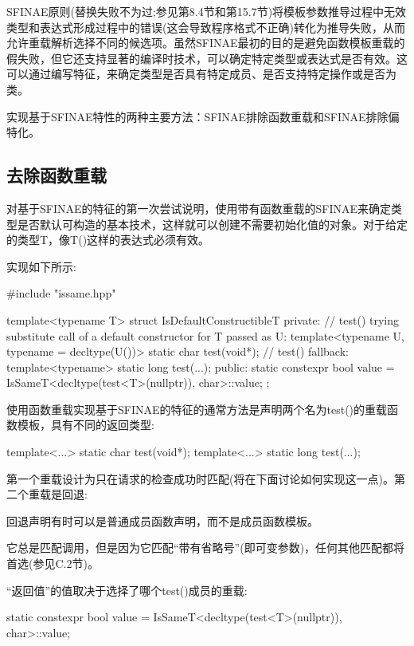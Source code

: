 
SFINAE原则(替换失败不为过;参见第8.4节和第15.7节)将模板参数推导过程中无效类型和表达式形成过程中的错误(这会导致程序格式不正确)转化为推导失败，从而允许重载解析选择不同的候选项。虽然SFINAE最初的目的是避免函数模板重载的假失败，但它还支持显著的编译时技术，可以确定特定类型或表达式是否有效。这可以通过编写特征，来确定类型是否具有特定成员、是否支持特定操作或是否为类。

实现基于SFINAE特性的两种主要方法：SFINAE排除函数重载和SFINAE排除偏特化。

\subsection{去除函数重载}

对基于SFINAE的特征的第一次尝试说明，使用带有函数重载的SFINAE来确定类型是否默认可构造的基本技术，这样就可以创建不需要初始化值的对象。对于给定的类型T，像T()这样的表达式必须有效。

实现如下所示:

\begin{cpp}
#include "issame.hpp"

template<typename T>
struct IsDefaultConstructibleT {
	private:
	// test() trying substitute call of a default constructor for T passed as U:
	template<typename U, typename = decltype(U())>
		static char test(void*);
	// test() fallback:
	template<typename>
		static long test(...);
	public:
	static constexpr bool value
		= IsSameT<decltype(test<T>(nullptr)), char>::value;
};
\end{cpp}

使用函数重载实现基于SFINAE的特征的通常方法是声明两个名为test()的重载函数模板，具有不同的返回类型:

\begin{cpp}
template<...> static char test(void*);
template<...> static long test(...);
\end{cpp}

第一个重载设计为只在请求的检查成功时匹配(将在下面讨论如何实现这一点)。第二个重载是回退:

\begin{notice}回退声明有时可以是普通成员函数声明，而不是成员函数模板。
\end{notice}

它总是匹配调用，但是因为它匹配“带有省略号”(即可变参数)，任何其他匹配都将首选(参见C.2节)。

“返回值”的值取决于选择了哪个test()成员的重载:

\begin{cpp}
static constexpr bool value
	= IsSameT<decltype(test<T>(nullptr)), char>::value;
\end{cpp}

